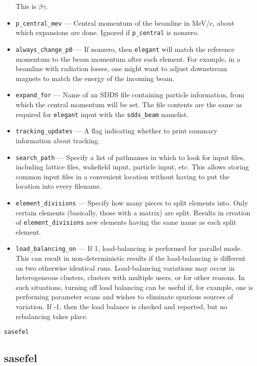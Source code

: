 \documentclass[11pt]{article}
\begin{document}
\begin{itemize}
        This is $\beta\gamma$.
\item \verb|p_central_mev| --- Central momentum of the beamline in
MeV/c, about which expansions are done.  Ignored if \verb|p_central| is nonzero.
\item \verb|always_change_p0| --- If nonzero, then {\tt elegant} will match the reference momentum to
  the beam momentum after each element.  For example, in a beamline with radiation losses, one might
  want to adjust downstream magnets to match the energy of the incoming beam.
\item \verb|expand_for| --- Name of an SDDS file containing particle information, from which the central
momentum will be set.  The file contents are the same as required for {\tt elegant} input with the \verb|sdds_beam| namelist.
\item \verb|tracking_updates| --- A flag indicating whether to print summary information about
tracking.
\item \verb|search_path| --- Specify a list of pathnames in which to look for input files,
 including lattice files, wakefield input, particle input, etc.  This allows storing common
 input files in a convenient location without having to put the location into every filename.
\item \verb|element_divisions| --- Specify how many pieces to split elements into.  Only 
 certain elements (basically, those with a matrix) are split.  Results in creation of 
 \verb|element_divisions| new elements having the same name as each split element.
\item \verb|load_balancing_on| --- If 1, load-balancing is performed for parallel mode.
 This can result in non-deterministic results if the load-balancing is different on two
 otherwise identical runs.  Load-balancing variations may occur in heterogeneous clusters,
 clusters with multiple users, or for other reasons.  In such situations, turning off 
 load balancing can be useful if, for example, one is performing parameter scans and
 wishes to eliminate spurious sources of variation.
 If -1, then the load balance is checked and reported, but no rebalancing takes place.
\end{itemize}

\newpage
\begin{center}{\Large\verb|sasefel|}\end{center}
\subsection{sasefel \label{subsec:sasefel}}
\end{document}
